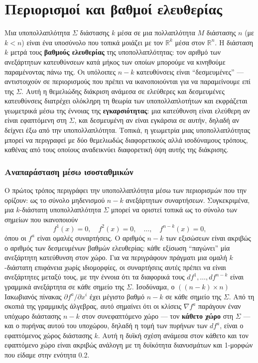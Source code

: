 \documentclass[11pt,a4paper,twoside,openright]{book}
\begin{document}
\section{Περιορισμοί και βαθμοί ελευθερίας}

Μια υποπολλαπλότητα $\Sigma$ διάστασης $k$ μέσα σε μια πολλαπλότητα $M$ διάστασης $n$ (με $k < n$) είναι ένα υποσύνολο που τοπικά μοιάζει με τον $\mathbb{R}^k$ μέσα στον $\mathbb{R}^n$. Η διάσταση $k$ μετρά τους \textbf{βαθμούς ελευθερίας} της υποπολλαπλότητας: τον αριθμό των ανεξάρτητων κατευθύνσεων κατά μήκος των οποίων μπορούμε να κινηθούμε παραμένοντας πάνω της. Οι υπόλοιπες $n-k$ κατευθύνσεις είναι ``δεσμευμένες'' --- αντιστοιχούν σε περιορισμούς που πρέπει να ικανοποιούνται για να παραμείνουμε επί της $\Sigma$. Αυτή η θεμελιώδης διάκριση ανάμεσα σε ελεύθερες και δεσμευμένες κατευθύνσεις διατρέχει ολόκληρη τη θεωρία των υποπολλαπλοτήτων και εκφράζεται γεωμετρικά μέσω της έννοιας της \textbf{εγκαρσιότητας}: μια κατεύθυνση είναι ελεύθερη αν είναι εφαπτόμενη στη $\Sigma$, και δεσμευμένη αν είναι εγκάρσια σε αυτήν, δηλαδή αν δείχνει έξω από την υποπολλαπλότητα. Τοπικά, η γεωμετρία μιας υποπολλαπλότητας μπορεί να περιγραφεί με δύο θεμελιωδώς διαφορετικούς αλλά ισοδύναμους τρόπους, καθένας από τους οποίους αναδεικνύει διαφορετική όψη αυτής της διάκρισης.

\subsubsection{Αναπαράσταση μέσω ισοσταθμικών}

Ο πρώτος τρόπος περιγράφει την υποπολλαπλότητα μέσω των περιορισμών που την ορίζουν: ως το σύνολο μηδενισμού $n-k$ ανεξάρτητων συναρτήσεων. Συγκεκριμένα, μια $k$-διάστατη υποπολλαπλότητα $\Sigma$ μπορεί να οριστεί τοπικά ως το σύνολο των σημείων που ικανοποιούν
\[
f^1(x) = 0, \quad f^2(x) = 0, \quad \dots, \quad f^{n-k}(x) = 0,
\]
όπου οι $f^a$ είναι ομαλές συναρτήσεις. Ο αριθμός $n-k$ των εξισώσεων είναι ακριβώς ο αριθμός των δεσμευμένων βαθμών ελευθερίας: κάθε εξίσωση ``παγώνει'' μία ανεξάρτητη κατεύθυνση στον χώρο. Για να περιγράφουν πράγματι μια ομαλή $k$-διάστατη επιφάνεια χωρίς ιδιομορφίες, οι συναρτήσεις αυτές πρέπει να είναι ανεξάρτητες μεταξύ τους, με την έννοια ότι τα διαφορικά τους $df^1, \dots, df^{n-k}$ είναι γραμμικά ανεξάρτητα σε κάθε σημείο της $\Sigma$. Ισοδύναμα, ο $((n-k) \times n)$ Ιακωβιανός πίνακας $\partial f^a / \partial x^i$ έχει μέγιστο βαθμό $n-k$ σε κάθε σημείο της $\Sigma$. Από τη σκοπιά της γραμμικής άλγεβρας, αυτό σημαίνει ότι οι κλίσεις $\nabla f^a$ παράγουν έναν υπόχωρο διάστασης $n-k$ στον συνεφαπτόμενο χώρο --- τον \textbf{κάθετο χώρο} στη $\Sigma$ --- και ο πυρήνας αυτού του υποχώρου, δηλαδή η τομή των πυρήνων των $df^a$, είναι ο εφαπτόμενος χώρος διάστασης $k$. Αυτή η δυϊκή σχέση ανάμεσα στον κάθετο και τον εφαπτόμενο χώρο είναι ακριβώς ανάλογη με τη δυϊκότητα διανυσμάτων και 1-μορφών που είδαμε στην ενότητα 0.2.
\end{document}
